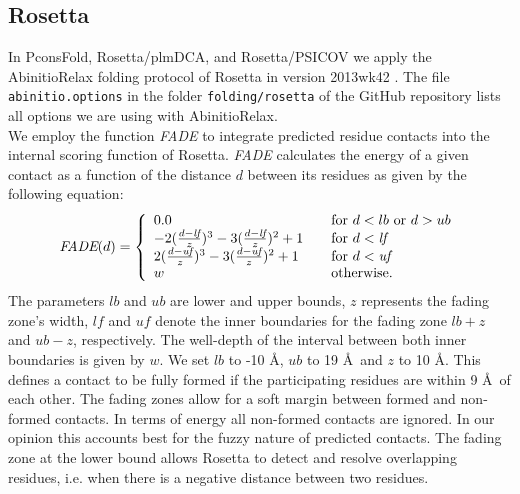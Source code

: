 \documentclass{bioinfo}
\begin{document}
\begin{methods}
\subsection{Rosetta}
In PconsFold, Rosetta/plmDCA, and Rosetta/PSICOV we apply the AbinitioRelax folding protocol \cite[]{rohl_protein_2004} of Rosetta in version 2013wk42 \cite[]{leaver-fay_rosetta3:_2011}. The file {\tt abinitio.options} in the folder {\tt folding/rosetta} of the GitHub repository lists all options we are using with AbinitioRelax. \\\indent 
We employ the function \emph{FADE} to integrate predicted residue contacts into the internal scoring function of Rosetta. \emph{FADE} calculates the energy of a given contact as a function of the distance $d$ between its residues as given by the following equation:
\begin{equation}%
\textit{FADE}(d) = \left\{
\begin{array}{l l l}\label{eq:fade}
0.0 & \quad \textrm{for $d < lb$ or $d > ub$} \\
-2(\frac{d - \textit{lf}}{z})^3 - 3(\frac{d - \textit{lf}}{z})^2 + 1 & \quad \textrm{for $d < \textit{lf}$} \\
2(\frac{d - \textit{uf}}{z})^3 - 3(\frac{d - \textit{uf}}{z})^2 + 1 & \quad \textrm{for $d < \textit{uf}$} \\
w & \quad \textrm{otherwise.} \\
\end{array} \right.
\end{equation}
The parameters $lb$ and $ub$ are lower and upper bounds, $z$ represents the fading zone's width, $\textit{lf}$ and $\textit{uf}$ denote the inner boundaries for the fading zone $lb + z$ and $ub - z$, respectively. The well-depth of the interval between both inner boundaries is given by $w$. We set $lb$ to -10 \AA, $ub$ to 19 \AA\ and $z$ to 10 \AA. This defines a contact to be fully formed if the participating residues are within 9 \AA\ of each other. The fading zones allow for a soft margin between formed and non-formed contacts. In terms of energy all non-formed contacts are ignored. In our opinion this accounts best for the fuzzy nature of predicted contacts. The fading zone at the lower bound allows Rosetta to detect and resolve overlapping residues, i.e. when there is a negative distance between two residues.\\\indent


\end{methods}
\end{document}
